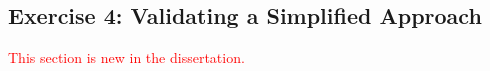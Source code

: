 \subsection{Exercise 4: Validating a Simplified Approach}

\textcolor{red}{This section is new in the dissertation.}